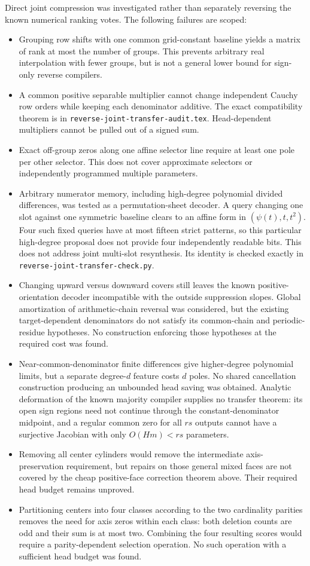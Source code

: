 \documentclass[11pt]{article}
\begin{document}
Direct joint compression was investigated rather than separately reversing
the known numerical ranking votes. The following failures are scoped:
\begin{itemize}
\item Grouping row shifts with one common grid-constant baseline yields
  a matrix of rank at most the number of groups. This prevents arbitrary
  real interpolation with fewer groups, but is not a general lower bound
  for sign-only reverse compilers.
\item A common positive separable multiplier cannot change independent
  Cauchy row orders while keeping each denominator additive. The exact
  compatibility theorem is in \texttt{reverse-joint-transfer-audit.tex}.
  Head-dependent multipliers cannot be pulled out of a signed sum.
\item Exact off-group zeros along one affine selector line require at
  least one pole per other selector. This does not cover approximate
  selectors or independently programmed multiple parameters.
\item Arbitrary numerator memory, including high-degree polynomial divided
  differences, was tested as a permutation-sheet decoder. A query changing
  one slot against one symmetric baseline clears to an affine form in
  $(\psi(t),t,t^2)$. Four such fixed queries have at most fifteen strict
  patterns, so this particular high-degree proposal does not provide four
  independently readable bits. This does not address joint multi-slot
  resynthesis. Its identity is checked exactly in
  \texttt{reverse-joint-transfer-check.py}.
\item Changing upward versus downward covers still leaves the known
  positive-orientation decoder incompatible with the outside suppression
  slopes. Global amortization of arithmetic-chain reversal was considered,
  but the existing target-dependent denominators do not satisfy its
  common-chain and periodic-residue hypotheses. No construction enforcing
  those hypotheses at the required cost was found.
\item Near-common-denominator finite differences give higher-degree
  polynomial limits, but a separate degree-$d$ feature costs $d$ poles.
  No shared cancellation construction producing an unbounded head saving
  was obtained. Analytic deformation of the known majority compiler
  supplies no transfer theorem: its open sign regions need not continue
  through the constant-denominator midpoint, and a regular common zero
  for all $rs$ outputs cannot have a surjective Jacobian with only
  $O(Hm)<rs$ parameters.
\item Removing all center cylinders would remove the intermediate
  axis-preservation requirement, but repairs on those general mixed faces
  are not covered by the cheap positive-face correction theorem above.
  Their required head budget remains unproved.
\item Partitioning centers into four classes according to the two
  cardinality parities removes the need for axis zeros within each class:
  both deletion counts are odd and their sum is at most two. Combining
  the four resulting scores would require a parity-dependent selection
  operation. No such operation with a sufficient head budget was found.
\end{itemize}
\end{document}
